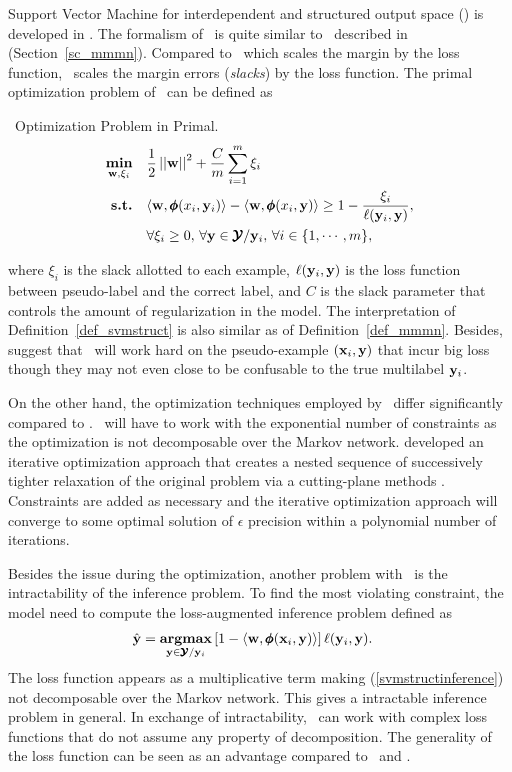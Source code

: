 {Support Vector Machine for interdependent and structured output space (\svmstruct) is developed in \citep{THJA04,TJTA05}.
The formalism of \svmstruct\ is quite similar to \mmmn\ described in (Section~\ref{sc_mmmn}).
Compared to \mmmn\ which scales the margin by the loss function, \svmstruct\ scales the margin errors ({\em slacks}) by the loss function.
The primal optimization problem of \svmstruct\ can be defined as
\begin{definition}{\svmstruct\ Optimization Problem in Primal.}\label{def_svmstruct}
	\begin{align*}
		\underset{\mathbf {w},\xi_i}{\textbf{min}} & \quad\frac{1}{2}\left|\left| \mathbf {w} \right|\right|^2 + \frac{C}{m}\sum_{i=1}^{m}\xi_i \\
		\textbf{s.t.} & \quad\langle \mathbf {w}, \pmb \phi(x_i,\mathbf {y}_i) \rangle - \langle \mathbf {w}, \pmb \phi(x_i,\mathbf {y}) \rangle \ge 1-\frac{\xi_i}{\mathbf {\ell}(\mathbf {y}_i,\mathbf {y})},\\
		& \quad \forall \xi_i\ge0,\, \forall \mathbf {y}\in\pmb {\mathcal{Y}}/\mathbf {y}_i,\, \forall i\in\{1,\cdots,m\},
	\end{align*}
\end{definition}
where $\xi_i$ is the slack allotted to each example, $\mathbf {\ell}(\mathbf {y}_i,\mathbf {y})$ is the loss function between pseudo-label and the correct label, and $C$ is the slack parameter that controls the amount of regularization in the model.
The interpretation of Definition~\ref{def_svmstruct} is also similar as of Definition~\ref{def_mmmn}.
Besides, \citet{THJA04} suggest that \mmmn\ will work hard on the pseudo-example $(\mathbf {x}_i,\mathbf {y})$ that incur big loss though they may not even close to be confusable to the true multilabel $\mathbf {y}_i$.

On the other hand, the optimization techniques employed by \svmstruct\ differ significantly compared to \mmmn.
\svmstruct\ will have to work with the exponential number of constraints as the optimization is not decomposable over the Markov network.
\citet{THJA04} developed an iterative optimization approach that creates a nested sequence of successively tighter relaxation of the original problem via a cutting-plane methods \citep{Bishop07,JFY09}.
Constraints are added as necessary and the iterative optimization approach will converge to some optimal solution of $\epsilon$ precision within a polynomial number of iterations.

Besides the issue during the optimization, another problem with \svmstruct\ is the intractability of the inference problem.
To find the most violating constraint, the model need to compute the loss-augmented inference problem \citep{TJTA05} defined as
\begin{align}
	\hat{\mathbf {y}} = \underset{\mathbf {y}\in\pmb {\mathcal{Y}}/\mathbf {y}_i}{\textbf{argmax}} &\, [1-\langle \mathbf {w}, \pmb \phi(\mathbf {x}_i,\mathbf {y}) \rangle]\,\mathbf {\ell}(\mathbf {y}_i,\mathbf {y}). \label{svmstructinference}
\end{align}
The loss function appears as a multiplicative term making (\ref{svmstructinference}) not decomposable over the Markov network.
This gives a intractable inference problem in general.
In exchange of intractability, \svmstruct\ can work with complex loss functions that do not assume any property of decomposition.
The generality of the loss function can be seen as an advantage compared to \crf\ and \mmmn.



}
